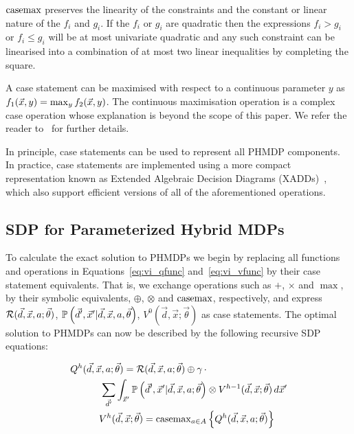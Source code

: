 $\mathrm{casemax}$ preserves the linearity of the constraints and the constant or linear nature of the {\footnotesize$f_i$} and {\footnotesize$g_i$}. If the {\footnotesize$f_i$} or {\footnotesize$g_i$} are quadratic then the expressions {\footnotesize$f_i > g_i$} or {\footnotesize$f_i \leq g_i$} will be at most univariate quadratic and any such constraint can be linearised into a combination of at most two linear inequalities by completing the square. 

A case statement can be maximised with respect to a continuous parameter {\footnotesize$y$} as {\footnotesize $ f_1(\vec{x}, y) = \contmax_{y}f_2(\vec{x}, y) $}. The continuous maximisation operation is a complex case operation whose explanation is beyond the scope of this paper. We refer the reader to~\parencite{Zamani_AAAI_2012} for further details.

In principle, case statements can be used to represent all PHMDP components. In practice, case statements are implemented using a more compact representation known as Extended Algebraic Decision Diagrams (XADDs)~\parencite{Sanner_UAI_2011}, which also support efficient versions of all of the aforementioned operations.

\subsection{SDP for Parameterized Hybrid MDPs}

To calculate the exact solution to PHMDPs we begin by replacing all functions and operations in Equations~\eqref{eq:vi_qfunc} and~\eqref{eq:vi_vfunc} by their case statement equivalents. That is, we exchange operations such as {\footnotesize$+$}, {\footnotesize$\times$} and {\footnotesize$\max$}, by their symbolic equivalents, {\footnotesize$\oplus$}, {\footnotesize$\otimes$} and $\mathrm{casemax}$, respectively, and express {\footnotesize $\mathcal{R}(\vec{d}, \vec{x}, a; \vec{\theta})$},  {\footnotesize $\mathbb{P}\left({\vec{d}', \vec{x}' | \vec{d}, \vec{x}, a, \vec{\theta}}\right)$}, {\footnotesize $V^0(\vec{d}, \vec{x}; \vec{\theta})$} as case statements. The optimal solution to PHMDPs can now be described by the following recursive SDP equations:

{\footnotesize 
    \abovedisplayskip=0pt
    \belowdisplayskip=0pt
    \begin{align}
        Q^{h}(\vec{d}, \vec{x}, a; \vec{\theta}) = \mathcal{R}(\vec{d}, \vec{x}, a; \vec{\theta}) \oplus \gamma \, \cdot &  \nonumber \\ 
        \sum_{\vec{d}'} \int_{\vec{x}'} \mathbb{P}\left({\vec{d}', \vec{x}' | \vec{d}, \vec{x}, a; \vec{\theta}}\right) & \otimes V^{h-1}(\vec{d}, \vec{x}; \vec{\theta}) \, d\vec{x}'  \label{eq:vi_sdp_qfunc} \\
        V^{h}(\vec{d}, \vec{x}; \vec{\theta}) = \mathrm{casemax}_{a \in A} & \left\{ Q^{h}(\vec{d}, \vec{x}, a; \vec{\theta}) \right\} \label{eq:vi_sdp_vfunc}
    \end{align}
}%

